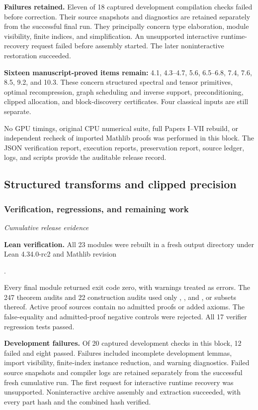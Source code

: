 \textbf{Failures retained.} Eleven of 18 captured development compilation checks failed before correction. Their source snapshots and diagnostics are retained separately from the successful final run. They principally concern type elaboration, module visibility, finite indices, and simplification. An unsupported interactive runtime-recovery request failed before assembly started. The later noninteractive restoration succeeded.

\textbf{Sixteen manuscript-proved items remain:} 4.1, 4.3--4.7, 5.6, 6.5--6.8, 7.4, 7.6, 8.5, 9.2, and 10.3. These concern structured spectral and tensor primitives, optimal recompression, graph scheduling and inverse support, preconditioning, clipped allocation, and block-discovery certificates. Four classical inputs are still separate.

No GPU timings, original CPU numerical suite, full Papers I--VII rebuild, or independent recheck of imported Mathlib proofs was performed in this block. The JSON verification report, execution reports, preservation report, source ledger, logs, and scripts provide the auditable release record.


\subsection{Structured transforms and clipped precision}\label{sec:history-4}


\subsubsection*{Verification, regressions, and remaining work}\label{history:supp4:subsection:007}\textit{Cumulative release evidence}\par
\textbf{Lean verification.} All 23 modules were rebuilt in a fresh output directory under Lean 4.34.0-rc2 and Mathlib revision
\begin{center}.\end{center}
Every final module returned exit code zero, with warnings treated as errors. The 247 theorem audits and 22 construction audits used only , , and , or subsets thereof. Active proof sources contain no admitted proofs or added axioms. The false-equality and admitted-proof negative controls were rejected. All 17 verifier regression tests passed.

\textbf{Development failures.} Of 20 captured development checks in this block, 12 failed and eight passed. Failures included incomplete development lemmas, import visibility, finite-index instance reduction, and warning diagnostics. Failed source snapshots and compiler logs are retained separately from the successful fresh cumulative run. The first request for interactive runtime recovery was unsupported. Noninteractive archive assembly and extraction succeeded, with every part hash and the combined hash verified.

